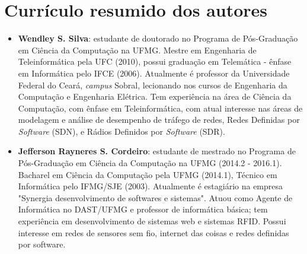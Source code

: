 \documentclass{SBCbookchapter}
\begin{document}
\section{Currículo resumido dos autores} %

\begin{itemize}

\item \textbf{Wendley S. Silva}: estudante de doutorado no Programa de Pós-Graduação em Ciência da Computação na UFMG. Mestre em Engenharia de Teleinformática pela UFC (2010), possui graduação em Telemática - ênfase em Informática pelo IFCE (2006). Atualmente é professor da Universidade Federal do Ceará, \textit{campus} Sobral, lecionando nos cursos de Engenharia da Computação e Engenharia Elétrica. Tem experiência na área de Ciência da Computação, com ênfase em Teleinformática, com atual interesse nas áreas de modelagem e análise de desempenho de tráfego de redes, Redes Definidas por \textit{Software} (SDN), e Rádios Definidos por \textit{Software} (SDR).

\item \textbf{Jefferson Rayneres S. Cordeiro}: estudante de mestrado no Programa de Pós-Graduação em Ciência da Computação na UFMG (2014.2 - 2016.1). Bacharel em Ciência da Computação pela UFMG (2014.1), Técnico em Informática pelo IFMG/SJE (2003). Atualmente é estagiário na empresa "Synergia desenvolvimento de softwares e sistemas". Atuou como Agente de Informática no DAST/UFMG e professor de informática básica; tem experiência em desenvolvimento de sistemas web e sistemas RFID. Possui interesse em redes de sensores sem fio, internet das coisas e redes definidas por software.



\end{itemize}
\end{document}

